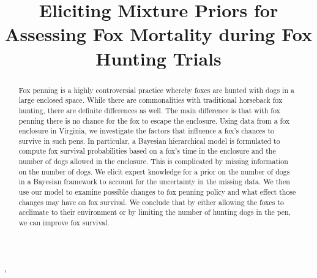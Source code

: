 \documentclass[aoas,preprint]{imsart}
\numberwithin{equation}{section}
\theoremstyle{plain}
\begin{document}
\newcommand{\andyc}[1]{[{\color{red}\sc Andy comment: {\tt #1}}]}

\begin{frontmatter}
\title{Eliciting Mixture Priors for Assessing Fox Mortality during Fox Hunting Trials}

\begin{aug}
\author{ },
\author{ }




\address{Department of Statistics, Virginia Tech\\
Hutcheson Hall 401-D\\
Blacksburg, VA 24061\\
\\
\phantom{E-mail:\ }}

\end{aug}

\begin{abstract}
Fox penning is a highly controversial practice whereby foxes are hunted with dogs in a large enclosed space. While there are commonalities with traditional horseback fox hunting, there are definite differences as well. The main difference is that with fox penning there is no chance for the fox to escape the enclosure. Using data from a fox enclosure in Virginia, we investigate the factors that influence a fox's chances to survive in such pens. In particular, a Bayesian hierarchical model is formulated to compute fox survival probabilities based on a fox's time in the enclosure and the number of dogs allowed in the enclosure. This is complicated by missing information on the number of dogs. We elicit expert knowledge for a prior on the number of dogs in a Bayesian framework to account for the uncertainty in the missing data. We then use our model to examine possible changes to fox penning policy and what effect those changes may have on fox survival. We conclude that by either allowing the foxes to acclimate to their environment or by limiting the number of hunting dogs in the pen, we can improve fox survival.
\end{abstract}

\begin{keyword}
\end{keyword}

\end{frontmatter}
\end{document}
